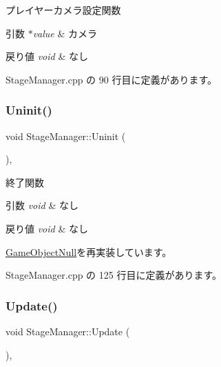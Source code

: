 プレイヤーカメラ設定関数 


\begin{DoxyParams}{引数}
{\em $\ast$value} & カメラ \\
\hline
\end{DoxyParams}

\begin{DoxyRetVals}{戻り値}
{\em void} & なし \\
\hline
\end{DoxyRetVals}


 Stage\+Manager.\+cpp の 90 行目に定義があります。

\mbox{\label{class_stage_manager_ab36f48dee34ce481c585b1d96df26dce}} 
\subsubsection{\texorpdfstring{Uninit()}{Uninit()}}
{\footnotesize\ttfamily void Stage\+Manager\+::\+Uninit (\begin{DoxyParamCaption}{ }\end{DoxyParamCaption})\hspace{0.3cm}{\ttfamily [override]}, {\ttfamily [virtual]}}



終了関数 


\begin{DoxyParams}{引数}
{\em void} & なし \\
\hline
\end{DoxyParams}

\begin{DoxyRetVals}{戻り値}
{\em void} & なし \\
\hline
\end{DoxyRetVals}


\mbox{\hyperlink{class_game_object_null_a1a70fbd3260fd1c0100320756830a0db}{Game\+Object\+Null}}を再実装しています。



 Stage\+Manager.\+cpp の 125 行目に定義があります。

\mbox{\label{class_stage_manager_a254173b565937107fdfe02c0871b3520}} 
\subsubsection{\texorpdfstring{Update()}{Update()}}
{\footnotesize\ttfamily void Stage\+Manager\+::\+Update (\begin{DoxyParamCaption}{ }\end{DoxyParamCaption})\hspace{0.3cm}{\ttfamily [override]}, {\ttfamily [virtual]}}



